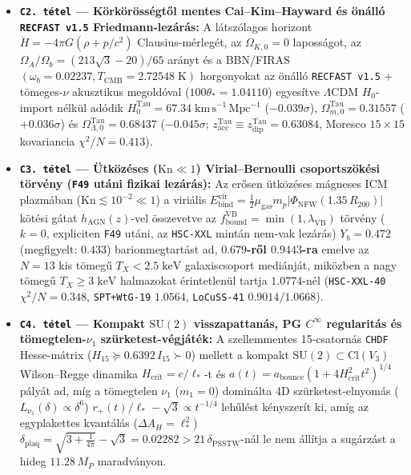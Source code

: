 \documentclass[11pt,a4paper]{article}
\theoremstyle{remark}
\begin{document}
\begin{itemize}
  \item \textbf{\texttt{C2.\ t\'etel} --- K\"ork\"or\"oss\'egt\H{o}l mentes Cai--Kim--Hayward \'es \"on\'all\'o \texttt{RECFAST v1.5} Friedmann-lez\'ar\'as:} A l\'atsz\'olagos horizont $\dot{H} = -4\pi G(\rho + p/c^2)$ Clausius-m\'erleg\'et, az $\Omega_{K,0} = 0$ laposs\'agot, az $\Omega_A/\Omega_b = (213\sqrt{3}-20)/65$ ar\'anyt \'es a BBN/FIRAS $(\omega_b = 0.02237, T_{\mathrm{CMB}} = 2.72548\;\mathrm{K})$ horgonyokat az \"on\'all\'o \texttt{RECFAST v1.5} + t\"omeges-$\nu$ akusztikus megold\'oval ($100\theta_* = 1.04110$) egyes\'itve $\Lambda\mathrm{CDM}$ $H_0$-import n\'elk\"ul ad\'odik $H_0^{\mathrm{Tau}} = 67.34\;\mathrm{km\,s^{-1}\,Mpc^{-1}}$ ($-0.039\sigma$), $\Omega_{m,0}^{\mathrm{Tau}} = 0.31557$ ($+0.036\sigma$) \'es $\Omega_{\Lambda,0}^{\mathrm{Tau}} = 0.68437$ ($-0.045\sigma$; $z_{\mathrm{acc}}^{\mathrm{Tau}} \equiv z_{\mathrm{dip}}^{\mathrm{Tau}} = 0.63084$, Moresco $15\times 15$ kovariancia $\chi^2/N = 0.413$).
  \item \textbf{\texttt{C3.\ t\'etel} --- \"Utk\"oz\'eses ($\mathrm{Kn} \ll 1$) Virial--Bernoulli csoportsz\"ok\'esi t\"orv\'eny (\texttt{F49} ut\'ani fizikai lez\'ar\'as):} Az er\H{o}sen \"utk\"oz\'eses m\'agneses ICM plazm\'aban ($\mathrm{Kn} \lesssim 10^{-2} \ll 1$) a viri\'alis $E_{\mathrm{bind}}^{\mathrm{vir}} = \frac{1}{2}\mu_{\mathrm{gas}}m_p|\Phi_{\mathrm{NFW}}(1.35\,R_{200})|$ k\"ot\'esi g\'atat $h_{\mathrm{AGN}}(z)$-vel \"osszevetve az $f_{\mathrm{bound}}^{\mathrm{VB}} = \min(1, \lambda_{\mathrm{VB}})$ t\"orv\'eny ($k = 0$, expliciten \texttt{F49} ut\'ani, az \texttt{HSC-XXL} mint\'an nem-vak lez\'ar\'as) $Y_b = 0.472$ (megfigyelt: $0.433$) barionmegtart\'ast ad, \textbf{$0.679$-r\H{o}l $0.9443$-ra} emelve az $N = 13$ kis t\"omeg\H{u} $T_X < 2.5\;\mathrm{keV}$ galaxiscsoport medi\'anj\'at, mik\"ozben a nagy t\"omeg\H{u} $T_X \ge 3\;\mathrm{keV}$ halmazokat \'erintetlen\"ul tartja \textbf{$1.0774$}-n\'el (\texttt{HSC-XXL-40} $\chi^2/N = 0.348$, \texttt{SPT+WtG-19} $1.0564$, \texttt{LoCuSS-41} $0.9014 / 1.0668$).
  \item \textbf{\texttt{C4.\ t\'etel} --- Kompakt $\mathrm{SU}(2)$ visszapattan\'as, PG $C^\infty$ regularit\'as \'es t\"omegtelen-$\nu_1$ sz\"urketest-v\'egj\'at\'ek:} A szellemmentes 15-csatorn\'as \texttt{CHDF} Hesse-m\'atrix ($H_{15} \succeq 0.6392\,I_{15} \succ 0$) mellett a kompakt $\mathrm{SU}(2) \subset \mathrm{Cl}(V_3)$ Wilson--Regge dinamika $H_{\mathrm{crit}} = c/\ell_*$-t \'es $a(t) = a_{\mathrm{bounce}}(1 + 4H_{\mathrm{crit}}^2 t^2)^{1/4}$ p\'aly\'at ad, m\'ig a t\"omegtelen $\nu_1$ ($m_1 = 0$) domin\'alta 4D sz\"urketest-elnyom\'as ($L_{\nu_1}(\delta) \propto \delta^6$) $r_+(t)/\ell_* - \sqrt{3} \propto t^{-1/4}$ leh\H{u}l\'est k\'enyszer\'it ki, am\'ig az egyplakettes kvant\'al\'as ($\Delta A_H = \ell_*^2$) $\delta_{\mathrm{plaq}} = \sqrt{3 + \frac{1}{4\pi}} - \sqrt{3} = 0.02282 > 21\,\delta_{\mathrm{PSSTW}}$-n\'al le nem \'all\'itja a sug\'arz\'ast a hideg $11.28\,M_P$ maradv\'anyon.
\end{itemize}
\end{document}
